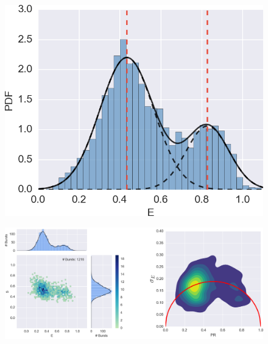 

\begin{figure}
\begin{center}
\includegraphics[width=0.8\singlefig]{"figures/hist_fit/hist_fit"}
\caption[]{}
\end{center}
\end{figure}






\begin{figure}
\begin{center}
\includegraphics[width=\doublefig]{"figures/20dA_20dT_200mMMgcl_ALEX_BVA5/20dA_20dT_200mMMgcl_ALEX_BVA5"}
\caption[]{}
\end{center}
\end{figure}

